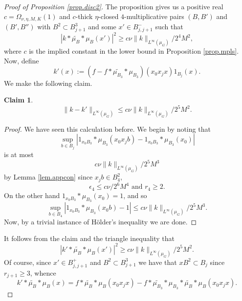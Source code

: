 \documentclass[12pt]{amsart}
\numberwithin{equation}{section}
\theoremstyle{plain}
\newtheorem*{claim}{Claim}
\theoremstyle{definition}
\renewcommand{\leq}{\leqslant}
\renewcommand{\geq}{\geqslant}
\begin{document}
\begin{proof}[Proof of Proposition \ref{prop.disc2}]
The proposition gives us a positive real $c = \Omega_{\nu,\eta,M,K}(1)$ and $c$-thick $\eta$-closed $4$-multiplicative pairs $(B,B')$ and $(B',B'')$ with $B^2 \subset B_{j+1}^3$ and some $x' \in B_{j,j+1}^-$ such that
\begin{equation*}
|k \ast \widetilde{\mu_{B}} \ast \mu_B(x')|^2 \geq c\nu \|k\|_{L^\infty(\mu_G)}/2^4M^2,
\end{equation*}
where $c$ is the implied constant in the lower bound in Proposition \ref{prop.mpls}. Now, define 
\begin{equation*}
k'(x):=(f - f \ast \widetilde{\mu_{B_3}} \ast \mu_{B_3})(x_0x_jx)1_{B_j}(x).
\end{equation*}
We make the following claim.
\begin{claim}
\begin{equation*}
\|k - k'\|_{L^\infty(\mu_G)} \leq c\nu \|k\|_{L^\infty(\mu_G)}/2^5M^2.
\end{equation*}
\end{claim}
\begin{proof}
We have seen this calculation before.  We begin by noting that
\begin{equation*}
\sup_{b \in B_j}|1_{x_0B_3} \ast \mu_{B_3}(x_0x_jb) - 1_{x_0B_3} \ast \mu_{B_3}(x_0) |
\end{equation*}
is at most
\begin{equation*}
c\nu \|k\|_{L^\infty(\mu_G)}/2^5M^3
\end{equation*}
by Lemma \ref{lem.appcon} since $x_jb \in B_4^2$, 
\begin{equation*}
\epsilon_4 \leq c\nu/2^6M^4 \textrm{ and } r_4 \geq 2.
\end{equation*}
On the other hand $1_{x_0B_3} \ast \mu_{B_3}(x_0)=1$, and so 
\begin{equation*}
\sup_{b \in B_4}|1_{x_0B_3} \ast \mu_{B_3}(x_0b) - 1| \leq c\nu \|k\|_{L^\infty(\mu_G)}/2^5M^3.
\end{equation*}
Now, by a trivial instance of H{\"o}lder's inequality we are done.
\end{proof}
It follows from the claim and the triangle inequality that
\begin{equation*}
|k' \ast \widetilde{\mu_{B}} \ast \mu_B(x')|^2 \geq c\nu \|k\|_{L^\infty(\mu_G)}/2^5M^2.
\end{equation*}
Of course, since $x' \in B_{j,j+1}^+$ and $B^2 \subset B_{j+1}^3$ we have that $xB^2 \subset B_j$ since $r_{j+1} \geq 3$, whence
\begin{equation*}
k' \ast \widetilde{\mu_{B}} \ast \mu_B(x)= f \ast\widetilde{\mu_{B}} \ast \mu_B(x_0x_jx) - f \ast \widetilde{\mu_{B_3}} \ast \mu_{B_3} \ast \widetilde{\mu_{B}} \ast \mu_B(x_0x_jx).

\end{equation*}
\end{proof}
\end{document}
